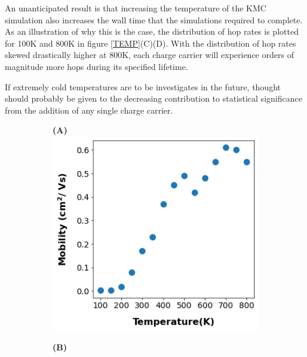 An unanticipated result is that increasing the temperature of the KMC
simulation also increases the wall time that the simulations required to
complete. As an illustration of why this is the case, the distribution of hop
rates is plotted for 100K and 800K in figure \ref{TEMP}(C)(D). With the distribution of hop rates skewed
drastically higher at 800K, each charge carrier will experience orders of
magnitude more hops during its specified lifetime. 

If extremely cold
temperatures are to be investigates in the future, thought should probably be given to
the decreasing contribution to statistical significance from the addition of
any single charge carrier. 



\begin{figure}[]
\centering
\begin{subfigure}{.5\textwidth}
    \textbf{(A)}
    \centering
    \includegraphics[width=\textwidth]{figures/temp.png}
    \newline
\end{subfigure}%
\begin{subfigure}{.5\textwidth}
    \textbf{(B)}
    \centering

\end{subfigure}
\end{figure}
